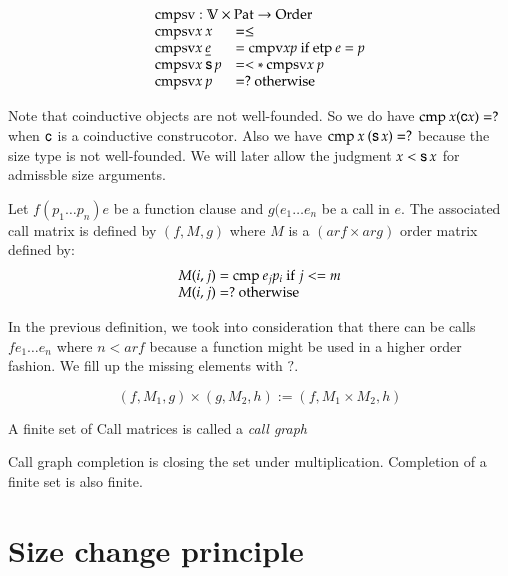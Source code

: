 \[
\begin{array}[t]{ll}
\multicolumn{2}{l}{\cmpsv : \cV \times \Pat \ra \order}\\ 
\cmpsv x \: x & = \leq \\
\cmpsv x \: \inacc{e} & = \cmpv x p \mbox{ if } \etp e = p \\
\cmpsv x \: \s p & = < * \: \cmpsv x \: p \\
\cmpsv x \: p & = ? \mbox{ otherwise}
\end{array}
\]

Note that coinductive objects are not well-founded. So we do have $\mathrm{cmp}\: x (\mathsf{c} x) = ? $ when $\mathsf{c}$ is a coinductive construcotor.
Also we have $\mathrm{cmp}\: x \: (\mathsf{s}\, x) = ? $ because the size type is not well-founded.
We will later allow the judgment $x < \mathsf{s}\, x$ for admissble size arguments.


\begin{definition}
Let $f (p_1 \ldots p_n) e$ be a function clause and $g (e_1 \ldots e_n$ be a call in $e$.
The associated call matrix   is defined by $(f,M,g)$ where $M$ is a $(ar f \times ar g)$ order matrix defined by:
\[ 
\begin{array}[t]{l}
M(i,j) = \mathrm{cmp}\: e_j p_i \mbox{ if } j <= m \\
M(i,j) = ? \mbox{ otherwise} 
\end{array}
\]
\end{definition}
In the previous definition, we took into consideration that there can be calls $f e_1 \ldots e_n$ where $n < ar f$ because a function might be used in a higher order fashion. We fill up the missing elements with $?$. 

\begin{definition}
\[(f,M_1,g) \times (g,M_2,h) := (f,M_1 \times M_2,h)\]
\end{definition}

\begin{definition}
A finite set of Call matrices is called a \emph{call graph}
\end{definition}

\begin{definition}
Call graph completion is closing the set under multiplication.
Completion of a finite set is also finite. 
\end{definition}

\section{Size change principle}

